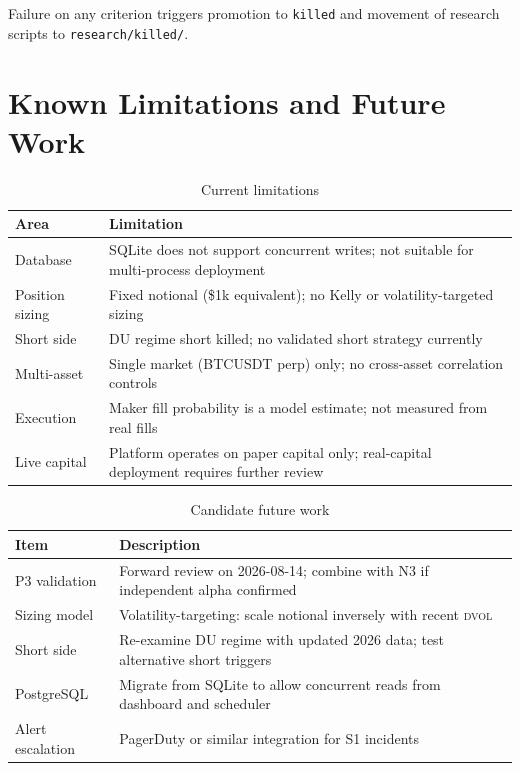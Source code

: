 \documentclass[12pt, a4paper]{article}
\theoremstyle{definition}
\newcommand{\DVOL}{\textsc{dvol}}
\begin{document}
Failure on any criterion triggers promotion to \texttt{killed} and movement
of research scripts to \texttt{research/killed/}.

\section{Known Limitations and Future Work}

\begin{table}[H]
\centering
\caption{Current limitations}
\begin{tabularx}{\linewidth}{lX}
\toprule
\textbf{Area} & \textbf{Limitation} \\
\midrule
Database        & SQLite does not support concurrent writes; not suitable for multi-process deployment \\
Position sizing & Fixed notional (\$1k equivalent); no Kelly or volatility-targeted sizing \\
Short side      & DU regime short killed; no validated short strategy currently \\
Multi-asset     & Single market (BTCUSDT perp) only; no cross-asset correlation controls \\
Execution       & Maker fill probability is a model estimate; not measured from real fills \\
Live capital    & Platform operates on paper capital only; real-capital deployment requires further review \\
\bottomrule
\end{tabularx}
\end{table}

\begin{table}[H]
\centering
\caption{Candidate future work}
\begin{tabularx}{\linewidth}{lX}
\toprule
\textbf{Item} & \textbf{Description} \\
\midrule
P3 validation & Forward review on 2026-08-14; combine with N3 if independent alpha confirmed \\
Sizing model  & Volatility-targeting: scale notional inversely with recent \DVOL{} \\
Short side    & Re-examine DU regime with updated 2026 data; test alternative short triggers \\
PostgreSQL    & Migrate from SQLite to allow concurrent reads from dashboard and scheduler \\
Alert escalation & PagerDuty or similar integration for S1 incidents \\
\bottomrule
\end{tabularx}
\end{table}
\end{document}
